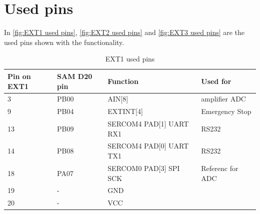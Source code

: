 \documentclass[a4paper,12pt]{scrreprt}
\begin{document}
\section{Used pins}
In \autoref{fig:EXT1 used pins}, \autoref{fig:EXT2 used pins} and \autoref{fig:EXT3 used pins} are the used pins shown with the functionality.
\begin{table}[H]
\centering
\begin{tabular}{|p{2.5cm}|p{2.8cm}|p{5.8cm}|p{3.5cm}|}
\hline
Pin on EXT1 & SAM D20 pin & Function                                   & Used for            \\ \hline
3           & PB00        & AIN[8]                                     & amplifier \acs{ADC} \\ \hline
9           & PB04        & EXTINT[4]                                  & Emergency Stop      \\ \hline
13          & PB09        & SERCOM4 PAD[1] UART RX1                    & \acs{RS232}         \\ \hline
14          & PB08        & SERCOM4 PAD[0] UART TX1                    & \acs{RS232}         \\ \hline
18          & PA07        & SERCOM0 PAD[3] SPI SCK                     &         Referenc for \acs{ADC}            \\ \hline
19          & -           & GND                                        &                     \\ \hline
20          & -           & VCC                                        &                     \\ \hline
\end{tabular}
\caption{EXT1 used pins}
\label{fig:EXT1 used pins}
\end{table}
\end{document}

